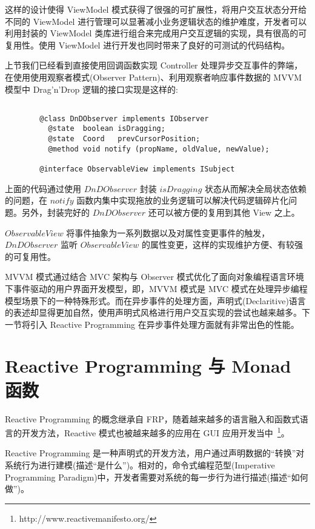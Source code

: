 这样的设计使得 ViewModel 模式获得了很强的可扩展性，将用户交互状态分开给不同的 ViewModel 进行管理可以显著减小业务逻辑状态的维护难度，开发者可以利用封装的 ViewModel 类库进行组合来完成用户交互逻辑的实现，具有很高的可复用性。使用 ViewModel 进行开发也同时带来了良好的可测试的代码结构。

上节我们已经看到直接使用回调函数实现 Controller 处理异步交互事件的弊端，在使用使用观察者模式(Observer Pattern)、利用观察者响应事件数据的 MVVM 模型中 Drag'n'Drop 逻辑的接口实现是这样的:

\begin{verbatim}

        @class DnDObserver implements IObserver
          @state  boolean isDragging;
          @state  Coord   prevCursorPosition;
          @method void notify (propName, oldValue, newValue);

        @interface ObservableView implements ISubject

\end{verbatim}

上面的代码通过使用 $DnDObserver$ 封装 $isDragging$ 状态从而解决全局状态依赖的问题，在 $notify$ 函数内集中实现拖放的业务逻辑可以解决代码逻辑碎片化问题。另外，封装完好的 $DnDObserver$ 还可以被方便的复用到其他 View 之上。

$ObservableView$ 将事件抽象为一系列数据以及对属性变更事件的触发，$DnDObserver$ 监听 $ObservableView$ 的属性变更，这样的实现维护方便、有较强的可复用性。

MVVM 模式通过结合 MVC 架构与 Observer 模式优化了面向对象编程语言环境下事件驱动的用户界面开发模型，即，MVVM 模式是 MVC 模式在处理异步编程模型场景下的一种特殊形式。而在异步事件的处理方面，声明式(Declaritive)语言的表述却显得更加自然，使用声明式风格进行用户交互实现的尝试也越来越多。下一节将引入 Reactive Programming 在异步事件处理方面就有非常出色的性能。

\section{Reactive Programming 与 Monad 函数}

Reactive Programming 的概念继承自 FRP，随着越来越多的语言融入和函数式语言的开发方法，Reactive 模式也被越来越多的应用在 GUI 应用开发当中~\footnote{http://www.reactivemanifesto.org/}。

Reactive Programming 是一种声明式的开发方法，用户通过声明数据的“转换”对系统行为进行建模(描述“是什么”)。相对的，命令式编程范型(Imperative Programming Paradigm)中，开发者需要对系统的每一步行为进行描述(描述“如何做”)。

